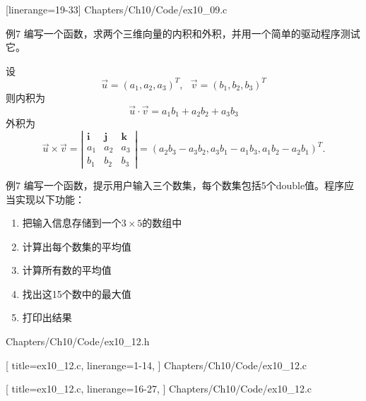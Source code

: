 \begin{frame}[fragile]\ft{\subsecname}

[linerange={19-33}]
{Chapters/Ch10/Code/ex10_09.c}
\end{frame}


\begin{frame}[fragile]\ft{\subsecname}
\begin{block}{例7}
编写一个函数，求两个三维向量的内积和外积，并用一个简单的驱动程序测试它。
\end{block}
设
$$
\vec u = (a_1,a_2,a_3)^T, ~~~ 
\vec v = (b_1,b_2,b_3)^T
$$
则内积为
$$
\vec u \cdot \vec v = a_1b_1+a_2b_2+a_3b_3
$$
外积为
$$
\vec u \times \vec v = 
\left|
\begin{array}{ccc}
\mathbf i & \mathbf j & \mathbf k \\
a_1 & a_2 & a_3 \\
b_1 & b_2 & b_3
\end{array}
\right| = (a_2b_3-a_3b_2, a_3b_1-a_1b_3, a_1b_2-a_2b_1)^T.
$$
\end{frame}



\begin{frame}[fragile]\ft{\subsecname}
\begin{block}{例7}
编写一个函数，提示用户输入三个数集，每个数集包括5个double值。程序应当实现以下功能：
\begin{enumerate}
\item 把输入信息存储到一个$3\times5$的数组中
\item 计算出每个数集的平均值
\item 计算所有数的平均值
\item 找出这15个数中的最大值
\item 打印出结果
\end{enumerate}
\end{block}
\end{frame}

\begin{frame}[fragile]\ft{\subsecname}

{Chapters/Ch10/Code/ex10_12.h}
\end{frame}

\begin{frame}[fragile]\ft{\subsecname}

[
title=ex10\_12.c,
linerange={1-14},
]
{Chapters/Ch10/Code/ex10_12.c}
\end{frame}

\begin{frame}[fragile]\ft{\subsecname}

[
title=ex10\_12.c,
linerange={16-27},
]
{Chapters/Ch10/Code/ex10_12.c}
\end{frame}

